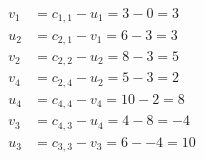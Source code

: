 \[
\begin{aligned}
v_{1} &= c_{1,1} - u_{1} = 3 - 0 = 3 \\
u_{2} &= c_{2,1} - v_{1} = 6 - 3 = 3 \\
v_{2} &= c_{2,2} - u_{2} = 8 - 3 = 5 \\
v_{4} &= c_{2,4} - u_{2} = 5 - 3 = 2 \\
u_{4} &= c_{4,4} - v_{4} = 10 - 2 = 8 \\
v_{3} &= c_{4,3} - u_{4} = 4 - 8 = -4 \\
u_{3} &= c_{3,3} - v_{3} = 6 - -4 = 10 \\
\end{aligned}
\]

